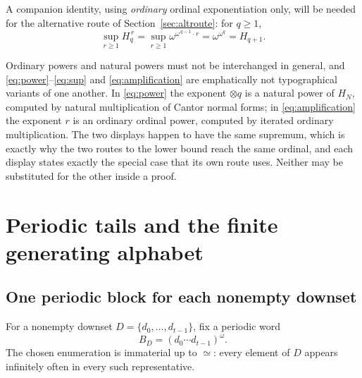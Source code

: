 \documentclass[11pt,a4paper]{article}
\numberwithin{equation}{section}
\theoremstyle{definition}
\theoremstyle{remark}
\newcommand{\eqv}{\simeq}
\newcommand{\Hn}[1]{H_{#1}}
\begin{document}
A companion identity, using \emph{ordinary} ordinal exponentiation only, will
be needed for the alternative route of Section~\ref{sec:altroute}: for
$q\ge1$,
\begin{equation}\label{eq:amplification}
 \sup_{r\ge1}\Hn q^{\,r}
  =\sup_{r\ge1}\omega^{\omega^{\,q-1}\cdot r}
  =\omega^{\omega^{q}}
  =\Hn{q+1}.
\end{equation}

Ordinary powers and natural powers must not be interchanged in general, and
\eqref{eq:power}--\eqref{eq:sup} and \eqref{eq:amplification} are emphatically
not typographical variants of one another. In \eqref{eq:power} the exponent
$\otimes q$ is a natural power of $\Hn N$, computed by natural multiplication
of Cantor normal forms; in \eqref{eq:amplification} the exponent $r$ is an
ordinary ordinal power, computed by iterated ordinary multiplication. The two
displays happen to have the same supremum, which is exactly why the two routes
to the lower bound reach the same ordinal, and each display states exactly the
special case that its own route uses. Neither may be substituted for the other
inside a proof.

\section{Periodic tails and the finite generating alphabet}
\label{sec:normalform}

\subsection{One periodic block for each nonempty downset}
For a nonempty downset $D=\{d_0,\ldots,d_{t-1}\}$, fix a periodic word
\begin{equation}\label{eq:block}
 B_D=(d_0\cdots d_{t-1})^\omega.
\end{equation}
The chosen enumeration is immaterial up to $\eqv$: every element of $D$
appears infinitely often in every such representative.
\end{document}
